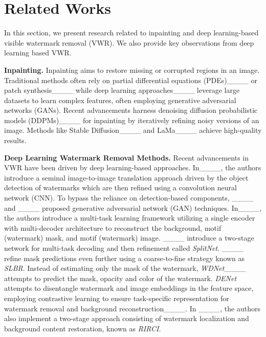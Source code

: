 \section{Related Works}
\label{sec:related_works}
In this section, we present research related to inpainting and deep learning-based visible watermark removal (VWR). We also provide key observations from deep learning based VWR.

\textbf{Inpainting.} Inpainting aims to restore missing or corrupted regions in an image. Traditional methods often rely on partial differential equations (PDEs)____ or patch synthesis____ while deep learning approaches____ leverage large datasets to learn complex features, often employing generative adversarial networks (GANs). Recent advancements harness denoising diffusion probabilistic models (DDPMs)____ for inpainting by iteratively refining noisy versions of an image. Methods like Stable Diffusion____ and LaMa____ achieve high-quality results.

\textbf{Deep Learning Watermark Removal Methods.} Recent advancements in VWR have been driven by deep learning-based approaches. In____, the authors introduce a seminal image-to-image translation approach driven by the object detection of watermarks which are then refined using a convolution neural network (CNN). To bypass the reliance on detection-based components, ____ and ____ proposed generative adversarial network (GAN) techniques. In____, the authors introduce a multi-task learning framework utilizing a single encoder with multi-decoder architecture to reconstruct the background, motif (watermark) mask, and motif (watermark) image. ____ introduce a two-stage network for multi-task decoding and then refinement called \textit{SplitNet}. ____ refine mask predictions even further using a coarse-to-fine strategy known as \textit{SLBR}. Instead of estimating only the mask of the watermark, \textit{WDNet}____ attempts to predict the mask, opacity and color of the watermark. \textit{DENet} attempts to disentangle watermark and image embeddings in the feature space, employing contrastive learning to ensure task-specific representation for watermark removal and background reconstruction____. In ____, the authors also implement a two-stage approach consisting of watermark localization and background content restoration, known as \textit{RIRCI}.

